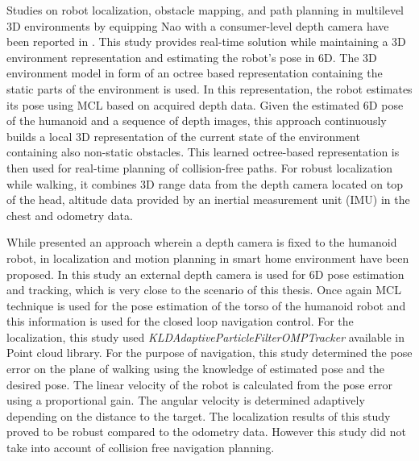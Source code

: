 {%
	
Studies on robot localization, obstacle mapping, and path planning in multilevel 3D environments by equipping Nao with a consumer-level depth camera have been reported in \cite{maier2012real}. This study provides real-time solution while maintaining a 3D environment representation and estimating the robot’s pose in 6D. The 3D environment model in form of an octree based representation containing the static parts of the environment is used. In this representation, the robot estimates its pose using MCL based on acquired depth data. Given the estimated 6D pose of the humanoid and a sequence of depth images, this approach continuously builds a local 3D representation of the current state of the environment containing also non-static obstacles. This learned octree-based representation is then used for real-time planning of collision-free paths. For robust localization while walking, it combines 3D range data from the depth camera located on top of the head, altitude data provided by an inertial measurement unit (IMU) in the chest and odometry data.
	
While \cite{maier2012real} presented an approach wherein a depth camera is fixed to the humanoid robot, in \cite{cervera2012localization} localization and motion planning in smart home environment have been proposed. In this study an external depth camera is used for 6D pose estimation and tracking, which is very close to the scenario of this thesis. Once again MCL technique is used for the pose estimation of the torso of the humanoid robot and this information is used for the closed loop navigation control. For the localization, this study used  \emph{KLDAdaptiveParticleFilterOMPTracker} available in Point cloud library. For the purpose of navigation, this study determined the pose error on the plane of walking using the knowledge of estimated pose and the desired pose. The linear velocity of the robot is calculated from the pose error using a proportional gain. The angular velocity is determined adaptively depending on the distance to the target. The localization results of this study proved to be robust compared to the odometry data. However this study did not take into account of collision free navigation planning. 
	
}
